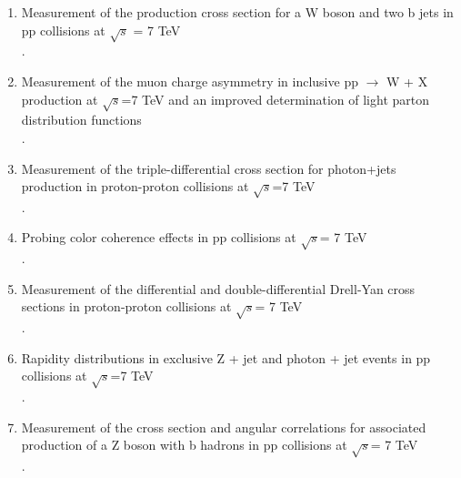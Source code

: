 \documentclass [12pt]{report}
\begin{document}
\begin{enumerate}
\item Measurement of the production cross section for a W boson and two b jets in pp collisions at $\sqrt{s}$ = 7 TeV\\
.

\item Measurement of the muon charge asymmetry in inclusive pp $\rightarrow$ W + X production at $\sqrt{s}$=7 TeV and an improved determination of light parton distribution functions \\
.

\item Measurement of the triple-differential cross section for photon+jets production in proton-proton collisions at $\sqrt{s}$=7 TeV \\
.

\item Probing color coherence effects in pp collisions at $\sqrt{s}$= 7 TeV\\
.

\item Measurement of the differential and double-differential Drell-Yan cross sections in proton-proton collisions at $\sqrt{s}$= 7 TeV\\
.

\item Rapidity distributions in exclusive Z + jet and photon + jet events in pp collisions at $\sqrt{s}$=7 TeV \\
.

\item Measurement of the cross section and angular correlations for associated production of a Z boson with b hadrons in pp collisions at $\sqrt{s}$= 7 TeV\\
.


\end{enumerate}
\end{document}
